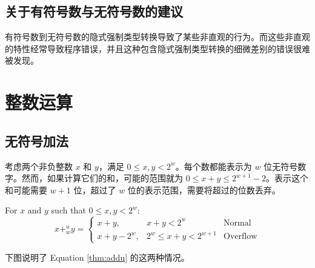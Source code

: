 \subsection{关于有符号数与无符号数的建议}

有符号数到无符号数的隐式强制类型转换导致了某些非直观的行为。而这些非直观的特性经常导致程序错误，并且这种包含隐式强制类型转换的细微差别的错误很难被发现。

\section{整数运算}

\subsection{无符号加法}

考虑两个非负整数 $x$ 和 $y$，满足 $0 \leq x, y < 2^w$。每个数都能表示为 $w$ 位无符号数字。然而，如果计算它们的和，可能的范围就为 $0 \leq x + y \leq 2^{w+1} - 2$。表示这个和可能需要 $w+1$ 位，超过了 $w$ 位的表示范围，需要将超过的位数丢弃。

\begin{theorem}
    For $x$ and $y$ such that $0 \leq x, y < 2^w$:
    \begin{equation}
        x +_w^u y = \left\{
        \begin{array}{lll}
            x + y, & x + y < 2^w & \text{Normal} \\
            x + y - 2^w, & 2^w \leq x+y < 2^{w+1} & \text{Overflow}
        \end{array}
        \right.
        \label{thm:addu}
    \end{equation}
\end{theorem}

下图说明了 Equation \eqref{thm:addu} 的这两种情况。

